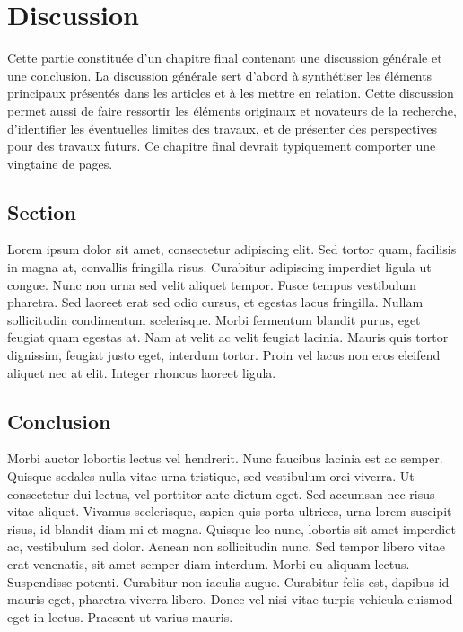 \chapter{Discussion}
Cette partie constituée d’un chapitre final contenant une discussion générale et une conclusion. La discussion générale sert d’abord à synthétiser les éléments principaux présentés dans les articles et à les mettre en relation. Cette discussion permet aussi de faire ressortir les éléments originaux et novateurs de la recherche, d’identifier les éventuelles limites des travaux, et de présenter des perspectives pour des travaux futurs. Ce chapitre final devrait typiquement comporter une vingtaine de pages.

\section{Section}
Lorem ipsum dolor sit amet, consectetur adipiscing elit. Sed tortor quam, facilisis in magna at, convallis fringilla risus. Curabitur adipiscing imperdiet ligula ut congue. Nunc non urna sed velit aliquet tempor. Fusce tempus vestibulum pharetra. Sed laoreet erat sed odio cursus, et egestas lacus fringilla. Nullam sollicitudin condimentum scelerisque. Morbi fermentum blandit purus, eget feugiat quam egestas at. Nam at velit ac velit feugiat lacinia. Mauris quis tortor dignissim, feugiat justo eget, interdum tortor. Proin vel lacus non eros eleifend aliquet nec at elit. Integer rhoncus laoreet ligula.

\section{Conclusion}

Morbi auctor lobortis lectus vel hendrerit. Nunc faucibus lacinia est ac semper. Quisque sodales nulla vitae urna tristique, sed vestibulum orci viverra. Ut consectetur dui lectus, vel porttitor ante dictum eget. Sed accumsan nec risus vitae aliquet. Vivamus scelerisque, sapien quis porta ultrices, urna lorem suscipit risus, id blandit diam mi et magna. Quisque leo nunc, lobortis sit amet imperdiet ac, vestibulum sed dolor. Aenean non sollicitudin nunc. Sed tempor libero vitae erat venenatis, sit amet semper diam interdum. Morbi eu aliquam lectus. Suspendisse potenti. Curabitur non iaculis augue. Curabitur felis est, dapibus id mauris eget, pharetra viverra libero. Donec vel nisi vitae turpis vehicula euismod eget in lectus. Praesent ut varius mauris.

